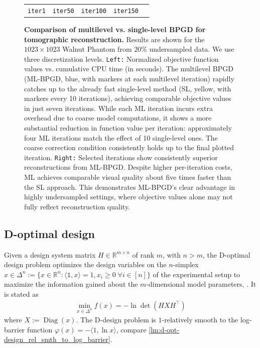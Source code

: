 \documentclass[11pt,reqno]{amsart}
\numberwithin{equation}{section}
\numberwithin{figure}{section}
\theoremstyle{plain}
\theoremstyle{definition}
\newcommand{\R}{\mathbb{R}}
\newcommand{\la}{\langle}
\newcommand{\ra}{\rangle}
\newcommand{\vphi}{\varphi}
\newcommand{\eins}{\mathbb{1}}
\DeclareMathOperator{\Diag}{Diag}
\begin{document}
\begin{figure}[ht]
\begin{minipage}[c]{0.5\columnwidth}
\begin{tabular}{c c c c c}
        \texttt{iter1} & \texttt{iter50} & \texttt{iter100} & \texttt{iter150} &\\ 
    \end{tabular}
\end{minipage}
\caption{
\textbf{Comparison of multilevel vs. single-level BPGD for tomographic reconstruction.} Results are shown for the $1023 \times 1023$ Walnut Phantom from $20\%$ undersampled data. We use three discretization levels.
\texttt{Left:} Normalized objective function values vs. cumulative CPU time (in seconds). The multilevel BPGD (ML-BPGD, blue, with markers at each multilevel iteration) rapidly catches up to the already fast single-level method (SL, yellow, with markers every 10 iterations), achieving comparable objective values in just seven iterations. While each ML iteration incurs extra overhead due to coarse model computations, it shows a more substantial reduction in function value per iteration: approximately four ML iterations match the effect of 10 single-level ones. The coarse correction condition consistently holds up to the final plotted iteration.
\texttt{Right:} Selected iterations show consistently superior reconstructions from ML-BPGD.  Despite higher per-iteration costs, ML achieves comparable visual quality about five times faster than the SL approach. This demonstrates ML-BPGD’s clear advantage in highly undersampled settings, where objective values alone may not fully reflect reconstruction quality.
}
\label{fig:tomography}
\end{figure}

\subsection{D-optimal design} \label{sec:d-optimal-design}
Given a design system matrix $H \in \R^{m \times n}$ of rank $m$, with $n > m$, the D-optimal design problem optimizes the design variables on the $n$-simplex $x \in \Delta^n := \{x \in \R^n: \la \eins, x \ra = 1, x_i \geq 0 \; \forall i \in [n]\}$ of the experimental setup to maximize the information gained about the $m$-dimensional model parameters, \cite{Atwood69:optimaldesign}. It is stated as
\begin{align} \label{eq:fine-model-d-optimal-design}
    \min_{x \in \Delta^n} f(x) = - \ln \det(HXH^\top)
\end{align}
where $X := \Diag(x)$. The D-design problem is $1$-relatively smooth to the log-barrier function $\vphi(x) = - \la 1, \ln x \ra$, compare \cref{lm:d-opt-design_rel_smth_to_log_barrier}.
\end{document}
